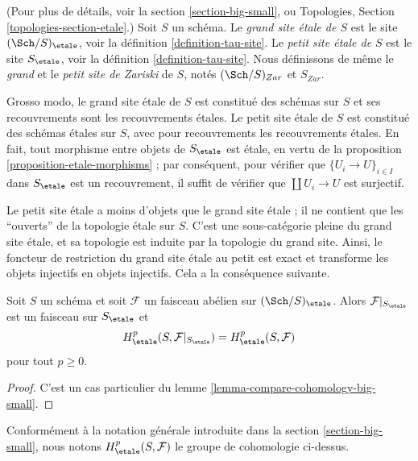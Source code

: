 \begin{definition}
\label{definition-big-etale-site}
(Pour plus de d\'etails, voir la section \ref{section-big-small}, ou
Topologies, Section \ref{topologies-section-etale}.)
Soit $S$ un sch\'ema.
Le {\it grand site \'etale de $S$} est le site
$(\Sch/S)_\etale$, voir
la d\'efinition \ref{definition-tau-site}.
Le {\it petit site \'etale de $S$} est le site $S_\etale$, voir
la d\'efinition \ref{definition-tau-site}.
Nous d\'efinissons de m\^eme le {\it grand} et le {\it petit site de Zariski} de $S$,
not\'es $(\Sch/S)_{Zar}$ et $S_{Zar}$.
\end{definition}

\noindent
Grosso modo, le grand site \'etale de $S$ est constitu\'e des sch\'emas sur $S$
et ses recouvrements sont les recouvrements \'etales. Le petit site \'etale de $S$ est constitu\'e
des sch\'emas \'etales sur $S$, avec pour recouvrements les recouvrements \'etales.
En fait, tout morphisme entre objets de $S_\etale$ est \'etale, en
vertu de la
proposition \ref{proposition-etale-morphisms} ;
par cons\'equent, pour v\'erifier que $\{U_i \to U\}_{i \in I}$ dans $S_\etale$
est un recouvrement, il suffit de v\'erifier que $\coprod U_i \to U$ est surjectif.

\medskip\noindent
Le petit site \'etale a moins d'objets que le grand site \'etale ; il
ne contient que les ``ouverts'' de la topologie \'etale sur $S$. C'est une sous-cat\'egorie
pleine du grand site \'etale, et sa topologie est induite par la
topologie du grand site. Ainsi, le foncteur de restriction
du grand site \'etale au petit est exact et transforme les objets injectifs en
objets injectifs. Cela a la cons\'equence suivante.

\begin{proposition}
\label{proposition-cohomology-restrict-small-site}
Soit $S$ un sch\'ema et soit $\mathcal{F}$ un faisceau ab\'elien sur
$(\Sch/S)_\etale$.
Alors $\mathcal{F}|_{S_\etale}$ est un faisceau sur $S_\etale$ et
$$
H^p_\etale(S, \mathcal{F}|_{S_\etale}) =
H^p_\etale(S, \mathcal{F})
$$
pour tout $p \geq 0$.
\end{proposition}

\begin{proof}
C'est un cas particulier du lemme \ref{lemma-compare-cohomology-big-small}.
\end{proof}

\noindent
Conform\'ement \`a la notation g\'en\'erale introduite dans la
section \ref{section-big-small},
nous notons $H_\etale^p(S, \mathcal{F})$ le groupe de cohomologie ci-dessus.





